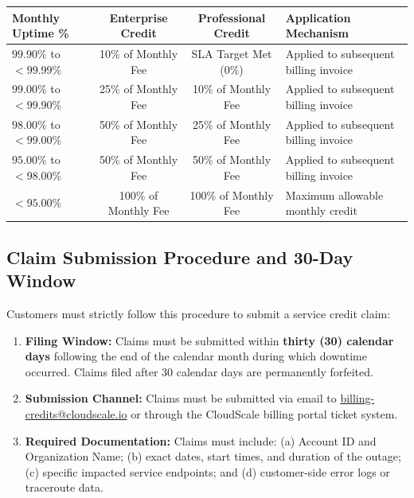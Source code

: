 \documentclass[10pt,letterpaper]{article}
\begin{document}
\vspace{1pt}
{\centering
\small
\renewcommand{\arraystretch}{1.08}
\begin{tabularx}{\linewidth}{@{}l c c X@{}}
\toprule
\rowcolor{tablehead}
\color{white}\textbf{Monthly Uptime \%} & \color{white}\textbf{Enterprise Credit} & \color{white}\textbf{Professional Credit} & \color{white}\textbf{Application Mechanism} \\
\midrule
\rowcolor{rowalt}
$99.90\%$ to $< 99.99\%$ & 10\% of Monthly Fee & SLA Target Met (0\%) & Applied to subsequent billing invoice \\
$99.00\%$ to $< 99.90\%$ & 25\% of Monthly Fee & 10\% of Monthly Fee & Applied to subsequent billing invoice \\
\rowcolor{rowalt}
$98.00\%$ to $< 99.00\%$ & 50\% of Monthly Fee & 25\% of Monthly Fee & Applied to subsequent billing invoice \\
$95.00\%$ to $< 98.00\%$ & 50\% of Monthly Fee & 50\% of Monthly Fee & Applied to subsequent billing invoice \\
\rowcolor{rowalt}
$< 95.00\%$ & 100\% of Monthly Fee & 100\% of Monthly Fee & Maximum allowable monthly credit \\
\bottomrule
\end{tabularx}
\label{tab:credit-brackets}
\par}

\subsection{Claim Submission Procedure and 30-Day Window}
Customers must strictly follow this procedure to submit a service credit claim:
\begin{enumerate}[leftmargin=1.5em, itemsep=0.5pt, topsep=1pt]
  \item \textbf{Filing Window:} Claims must be submitted within \textbf{thirty (30) calendar days} following the end of the calendar month during which downtime occurred. Claims filed after 30 calendar days are permanently forfeited.
  \item \textbf{Submission Channel:} Claims must be submitted via email to \url{billing-credits@cloudscale.io} or through the CloudScale billing portal ticket system.
  \item \textbf{Required Documentation:} Claims must include: (a) Account ID and Organization Name; (b) exact dates, start times, and duration of the outage; (c) specific impacted service endpoints; and (d) customer-side error logs or traceroute data.
\end{enumerate}
\end{document}
